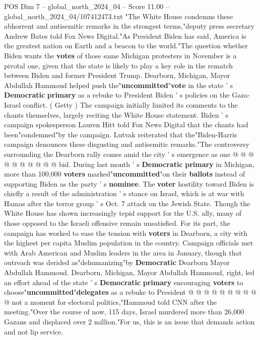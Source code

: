 \begin{textsample}{POS Dim 7 – global\_north\_2024\_04 – Score 11.00 – global\_north\_2024\_04/107412473.txt}  \label{ex:f7_pos_063}
"The White House condemns these abhorrent and antisemitic remarks in the strongest terms,"deputy press secretary Andrew Bates told Fox News Digital."As President Biden has said, America is the greatest nation on Earth and a beacon to the world."The question whether Biden wants the \textbf{votes} of those same Michigan protesters in November is a pivotal one, given that the state is likely to play a key role in the rematch between Biden and former President Trump.
Dearborn, Michigan, Mayor Abdullah Hammoud helped push the"\textbf{uncommitted}"\textbf{vote} in the state ' s \textbf{Democratic} \textbf{primary} as a rebuke to President Biden ' s policies on the Gaza-Israel conflict. ( Getty ) The campaign initially limited its comments to the chants themselves, largely reciting the White House statement.
Biden ' s campaign spokesperson Lauren Hitt told Fox News Digital that the chants had been"condemned"by the campaign.
Lutvak reiterated that the"Biden-Harris campaign denounces these disgusting and antisemitic remarks."The controversy surrounding the Dearborn rally comes amid the city ' s emergence as one @ @ @ @ @ @ @ @ @ @ bid.
During last month ' s \textbf{Democratic} \textbf{primary} in Michigan, more than 100,000 \textbf{voters} marked"\textbf{uncommitted}"on their \textbf{ballots} instead of supporting Biden as the party ' s \textbf{nominee}.
The \textbf{voter} hostility toward Biden is chiefly a result of the administration ' s stance on Israel, which is at war with Hamas after the terror group ' s Oct. 7 attack on the Jewish State.
Though the White House has shown increasingly tepid support for the U.S. ally, many of those opposed to the Israeli offensive remain unsatisfied.
For its part, the campaign has worked to ease the tension with \textbf{voters} in Dearborn, a city with the highest per capita Muslim population in the country.
Campaign officials met with Arab American and Muslim leaders in the area in January, though that outreach was derided as"dehumanizing"by \textbf{Democratic} Dearborn Mayor Abdullah Hammoud.
Dearborn, Michigan, Mayor Abdullah Hammoud, right, led an effort ahead of the state ' s \textbf{Democratic} \textbf{primary} encouraging \textbf{voters} to choose"\textbf{uncommitted}"\textbf{delegates} as a rebuke to President @ @ @ @ @ @ @ @ @ @ not a moment for electoral politics,"Hammoud told CNN after the meeting."Over the course of now, 115 days, Israel murdered more than 26,000 Gazans and displaced over 2 million."For us, this is an issue that demands action and not lip service.

\end{textsample}
